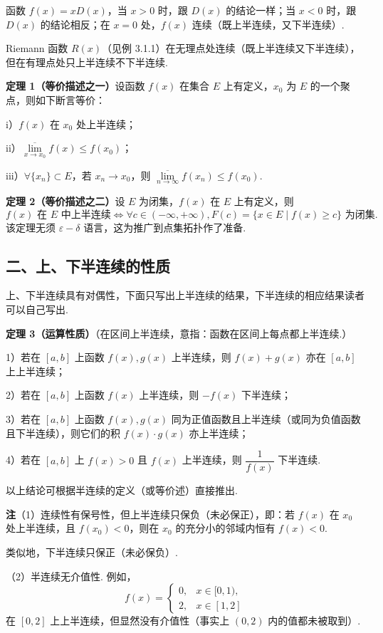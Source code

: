 \documentclass[UTF8,12pt,a4paper,fontset=fandol]{ctexart}
\begin{document}
函数 $f(x)=xD(x)$，当 $x>0$ 时，跟 $D(x)$ 的结论一样；当 $x<0$ 时，跟 $D(x)$ 的结论相反；在 $x=0$ 处，$f(x)$ 连续（既上半连续，又下半连续）.

Riemann 函数 $R(x)$（见例 3.1.1）在无理点处连续（既上半连续又下半连续），但在有理点处只上半连续不下半连续.

\noindent\textbf{定理 1（等价描述之一）}\quad 设函数 $f(x)$ 在集合 $E$ 上有定义，$x_0$ 为 $E$ 的一个聚点，则如下断言等价：

i）$f(x)$ 在 $x_0$ 处上半连续；

ii）$\overline{\lim\limits_{x\to x_0}}f(x)\le f(x_0)$；

iii）$\forall\{x_n\}\subset E$，若 $x_n\to x_0$，则 $\overline{\lim\limits_{n\to\infty}}f(x_n)\le f(x_0)$.

\noindent\textbf{定理 2（等价描述之二）}\quad 设 $E$ 为闭集，$f(x)$ 在 $E$ 上有定义，则
\[
  f(x)\text{ 在 }E\text{ 中上半连续}
  \Longleftrightarrow \forall c\in(-\infty,+\infty),F(c)=\{x\in E\mid f(x)\ge c\}\text{ 为闭集}.
\]
该定理无须 $\varepsilon-\delta$ 语言，这为推广到点集拓扑作了准备.

\subsection*{二、上、下半连续的性质}

上、下半连续具有对偶性，下面只写出上半连续的结果，下半连续的相应结果读者可以自己写出.

\noindent\textbf{定理 3（运算性质）}\quad （在区间上半连续，意指：函数在区间上每点都上半连续.）

1）若在 $[a,b]$ 上函数 $f(x),g(x)$ 上半连续，则 $f(x)+g(x)$ 亦在 $[a,b]$ 上上半连续；

2）若在 $[a,b]$ 上函数 $f(x)$ 上半连续，则 $-f(x)$ 下半连续；

3）若在 $[a,b]$ 上函数 $f(x),g(x)$ 同为正值函数且上半连续（或同为负值函数且下半连续），则它们的积 $f(x)\cdot g(x)$ 亦上半连续；

4）若在 $[a,b]$ 上 $f(x)>0$ 且 $f(x)$ 上半连续，则 $\dfrac1{f(x)}$ 下半连续.

以上结论可根据半连续的定义（或等价述）直接推出.

\noindent\textbf{注}\quad （1）连续性有保号性，但上半连续只保负（未必保正），即：若 $f(x)$ 在 $x_0$ 处上半连续，且 $f(x_0)<0$，则在 $x_0$ 的充分小的邻域内恒有 $f(x)<0$.

类似地，下半连续只保正（未必保负）.

（2）半连续无介值性. 例如，
\[
  f(x)=
  \begin{cases}
    0, & x\in[0,1),\\
    2, & x\in[1,2]
  \end{cases}
\]
在 $[0,2]$ 上上半连续，但显然没有介值性（事实上 $(0,2)$ 内的值都未被取到）.
\end{document}
